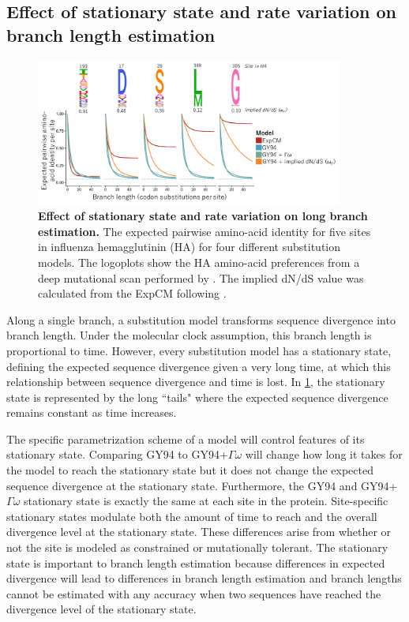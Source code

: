 \documentclass[11pt]{article}
\begin{document}
\subsection*{Effect of stationary state and rate variation on branch length estimation}

\begin{figure}[H]
\centerline{\includegraphics[width=0.90\textwidth]{figures/decay.pdf}}
\caption{\label{fig:decay}
\textbf{Effect of stationary state and rate variation on long branch estimation.}
The expected pairwise amino-acid identity for five sites in influenza hemagglutinin (HA) for four different substitution models. 
The logoplots show the HA amino-acid preferences from a deep mutational scan performed by \cite{doud2016accurate}. 
The implied dN/dS value was calculated from the ExpCM following \cite{spielman2015relationship}.
}
\end{figure}

Along a single branch, a substitution model transforms sequence divergence into branch length. 
Under the molecular clock assumption, this branch length is proportional to time.  
However, every substitution model has a stationary state, defining the expected sequence divergence given a very long time, at which this relationship between sequence divergence and time is lost. 
In \ref{fig:decay}, the stationary state is represented by the long ``tails" where the expected sequence divergence remains constant as time increases. 

The specific parametrization scheme of a model will control features of its stationary state. 
Comparing GY94 to GY94+$\Gamma\omega$ will change how long it takes for the model to reach the stationary state but it does not change the expected sequence divergence at the stationary state. 
Furthermore, the GY94 and GY94+$\Gamma\omega$ stationary state is exactly the same at each site in the protein. 
Site-specific stationary states modulate both the amount of time to reach and the overall divergence level at the stationary state. 
These differences arise from whether or not the site is modeled as constrained or mutationally tolerant.  
The stationary state is important to branch length estimation because differences in expected divergence will lead to differences in branch length estimation and branch lengths cannot be estimated with any accuracy when two sequences have reached the divergence level of the stationary state. 
\end{document}
